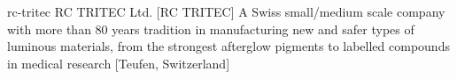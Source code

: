 \newglsXcompany%
{rc-tritec}%
{RC TRITEC Ltd.}%
[RC TRITEC]%
{A Swiss small/medium scale company with more than 80 years tradition in manufacturing new and safer types of luminous materials, from the strongest afterglow pigments to labelled compounds in medical research \cite{website:RC-TRITEC}}%
[Teufen, Switzerland]%